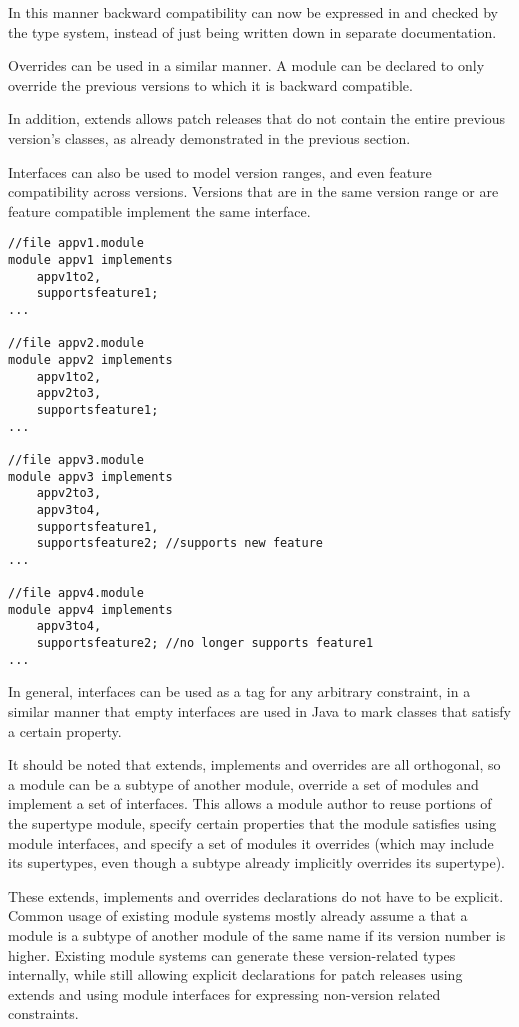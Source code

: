 In this manner backward compatibility can now be expressed in 
and checked by the type system, instead of just being written
down in separate documentation.

Overrides can be used in a similar manner. A module can be declared to only 
override the previous versions to which it is backward compatible.

In addition, extends allows patch releases that do not contain 
the entire previous version's classes, as already demonstrated in
the previous section.

Interfaces can also be used to model version ranges, and even feature
compatibility across versions. Versions that are in the same version 
range or are feature compatible implement the same interface.

\begin{lstlisting}[caption=Interfaces as Properties]
//file appv1.module
module appv1 implements 
	appv1to2, 
	supportsfeature1;
...

//file appv2.module
module appv2 implements 
	appv1to2, 
	appv2to3, 
	supportsfeature1;
...

//file appv3.module
module appv3 implements 
	appv2to3, 
	appv3to4, 
	supportsfeature1, 
	supportsfeature2; //supports new feature
...

//file appv4.module
module appv4 implements 
	appv3to4, 
	supportsfeature2; //no longer supports feature1
...
\end{lstlisting}

In general, interfaces can be used as a tag for any arbitrary constraint, 
in a similar manner that empty interfaces are used in Java to mark classes 
that satisfy a certain property.

It should be noted that extends, implements and overrides are all orthogonal,
so a module can be a subtype of another module, override a set of modules and
implement a set of interfaces. This allows a module author to reuse portions
of the supertype module, specify certain properties that the module satisfies
using module interfaces, and specify a set of modules it overrides (which may
include its supertypes, even though a subtype already implicitly overrides
its supertype).

These extends, implements and overrides declarations do not have to be explicit.
Common usage of existing module systems mostly already assume a that a 
module is a subtype of another module of the same name if its version 
number is higher. Existing module systems can generate these version-related types 
internally, while still allowing explicit declarations for patch releases 
using extends and using module interfaces for expressing non-version
related constraints.

